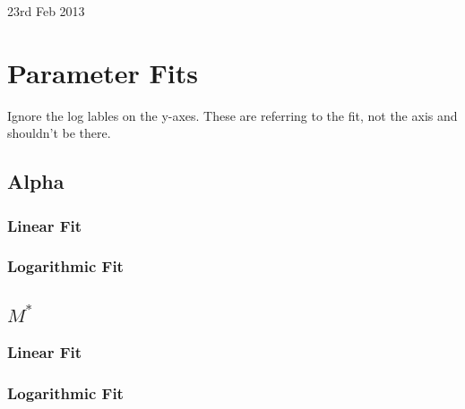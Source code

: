 \documentclass{article}
\begin{document}
\small{23rd Feb 2013}
\section{Parameter Fits}
	Ignore the log lables on the y-axes. These are referring to the fit, not the axis and shouldn't be there.
	\subsection{Alpha}
		\subsubsection{Linear Fit}
		\begin{figure}[ht]
			\begin{center}
				
			\end{center}
		\end{figure}

		\subsubsection{Logarithmic Fit}
		\begin{figure}[ht]
			\begin{center}
				
			\end{center}
		\end{figure}
		\newpage

	\subsection{$M^{*}$}
		\subsubsection{Linear Fit}
		\begin{figure}[ht]
			\begin{center}
				
			\end{center}
		\end{figure}

		\subsubsection{Logarithmic Fit}
		\begin{figure}[ht]
			\begin{center}
				
			\end{center}
		\end{figure}
		\newpage
\end{document}
